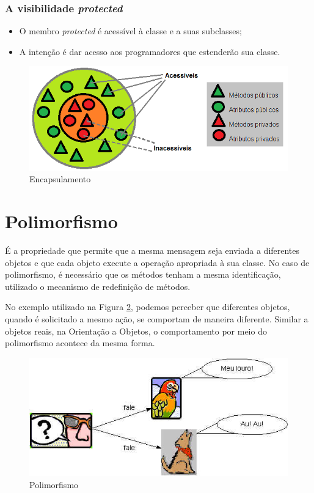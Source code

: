 \subsubsection{A visibilidade \textit{protected}}
\begin{itemize}
  \item O membro \textit{protected} é acessível à classe e a suas subclasses;
  \item A intenção é dar acesso aos programadores que estenderão sua classe.
\end{itemize}

\begin{figure}[H]
  \centering
  \includegraphics[scale=0.45]{imagens/encapsulamento.png}
  \caption{Encapsulamento}
  \label{fig:encapsulamento}
\end{figure}

\section{Polimorfismo}

É a propriedade que permite que a mesma mensagem seja enviada a diferentes objetos e que cada objeto execute a operação apropriada à sua classe. No caso de polimorfismo, é necessário que os métodos tenham a mesma identificação, utilizado o mecanismo de redefinição de métodos.

No exemplo utilizado na Figura \ref{fig:polimorfismo}, podemos perceber que diferentes objetos, quando é solicitado a mesmo ação, se comportam de maneira diferente. Similar a objetos reais, na Orientação a Objetos, o comportamento por meio do polimorfismo acontece da mesma forma. 

\begin{figure}[H]
  \centering
  \includegraphics[scale=0.2]{imagens/polianimais.jpg}
  \caption{Polimorfismo}
  \label{fig:polimorfismo}
\end{figure}


